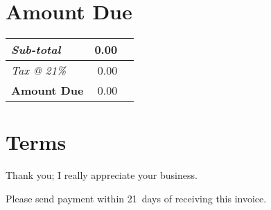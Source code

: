 \documentclass[a4paper,table]{article}
\begin{document}
\section*{Amount Due}
\label{sec:orgheadline4}

\hfill\colorbox{prlp-gray96}{\begin{minipage}{7.5cm}
\begin{center}
\begin{tabu}{Xrl}
\emph{Sub-total} & 0.00 & \texteuro{}\\
\hline
\emph{Tax @ 21\%} & 0.00 & \texteuro{}\\
\hline
\textbf{Amount Due} & 0.00 & \textbf{\texteuro{}}\\
\end{tabu}
\end{center}

\end{minipage}}

\section*{Terms}
\label{sec:orgheadline5}

Thank you; I really appreciate your business.

Please send payment within 21~days of receiving this invoice.

\vfill
\end{document}
